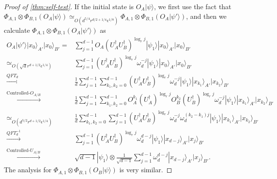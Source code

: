 \documentclass[11pt,letterpaper]{article}
\newcommand{\ket}[1]{|#1\rangle}
\newcommand{\x}{\otimes}
\newcommand{\ct}{^{\dagger}}
\newcommand{\1}{\mathbb{1}}
\newcommand{\ep}{\epsilon}
\newcommand{\sd}{\sqrt{d}}
\newcommand{\appd}[1]{\simeq_{#1}}
\theoremstyle{definition}
\begin{document}
\begin{proof}[Proof of \cref{thm:self-test}]
If the initial state is $O_A\ket{\psi}$, we first use the fact that 
$ \Phi_{A,1} \x \Phi_{B,1} (O_A\ket{\psi}) \appd{O(d^{5/4} r^{d/2+1/4} \ep^{1/8})}  \Phi_{A,1} \x \Phi_{B,1} (O_A\ket{\psi'})$, 
and then we calculate $\Phi_{A,1} \x \Phi_{B,1} (O_A\ket{\psi'})$ as
\begin{align*}
	O_A \ket{\psi'} \ket{x_0}_{A'}\ket{x_0}_{B'} =&  
		\sum_{j=1}^{d-1} O_A(U_A\ct U_B\ct)^{\log_r j}\ket{\psi_1}\ket{x_0}_{A'}\ket{x_0}_{B'}\\
		\appd{O(\sd r^{d+1/2} \ep^{1/4})}&\sum_{j=1}^{d-1}(U_A\ct U_B\ct)^{\log_r j} \omega_d^{-j} \ket{\psi_1} \ket{x_0}_{A'}\ket{x_0}_{B'}\\
		\xrightarrow[]{QFT_d} &\frac{1}{d}\sum_{j=1}^{d-1} \sum_{k_1,k_2 = 0}^{d-1}(U_A\ct U_B\ct)^{\log_r j} \omega_d^{-j} 
		\ket{\psi_1}\ket{x_{k_1}}_{A'}\ket{x_{k_2}}_{B'}\\
		\xrightarrow[]{\text{Controlled-}O_{A/B}}&\frac{1}{d}\sum_{j=1}^{d-1}\sum_{k_1,k_2 = 0}^{d-1} 
		 O_A^{k_1}(U_A\ct)^{\log_r j} O_B^{k_2}(U_B\ct)^{\log_r j} \omega_d^{-j} \ket{\psi_1} 
		 \ket{x_{k_1}}_{A'}\ket{x_{k_2}}_{B'}\\
		\appd{O(d^{5/2} r^{d+1/2}  \ep^{1/4})}& \frac{1}{d}\sum_{k_1,k_2 = 0}^{d-1} \sum_{j=1}^{d-1} (U_A\ct U_B\ct)^{\log_r j}
		\omega_d^{-j}\omega_d^{(k_2-k_1)j}\ket{\psi_1}
		 \ket{x_{k_1}}_{A'}\ket{x_{k_2}}_{B'}\\
		\xrightarrow[]{QFT_d^{-1}}& \sum_{j=1}^{d-1}  (U_A\ct U_B\ct)^{\log_r j}  
		\omega_d^{d-j}\ket{\psi_1} \ket{x_{d-j}}_{A'}\ket{x_j}_{B'}\\
		\xrightarrow[]{\text{Controlled-}U_{A/B}}&   \sqrt{d-1} \ket{\psi_1} \x  
		\frac{1}{\sqrt{d-1}}\sum_{j=1}^{d-1} \omega_d^{d-j}\ket{x_{d-j}}_{A'}\ket{x_j}_{B'}.
\end{align*}
The analysis for $\Phi_{A,1} \x\Phi_{B,1} (O_B \ket{\psi})$ is very similar.


\end{proof}
\end{document}
